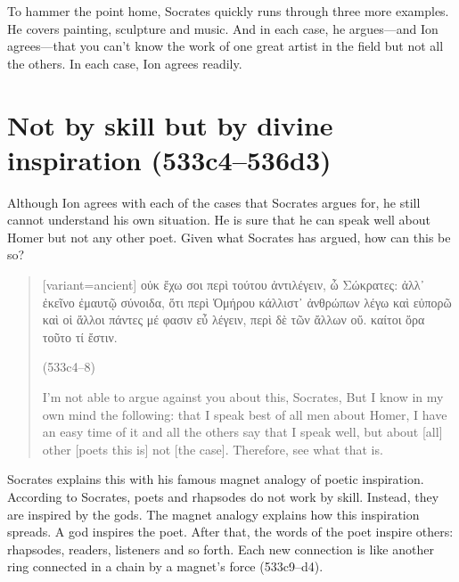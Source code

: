 \documentclass[12pt,letterpaper]{article}
\begin{document}
To hammer the point home, Socrates quickly runs through three more examples. He covers painting, sculpture and music. And in each case, he argues---and Ion agrees---that you can't know the work of one great artist in the field but not all the others. In each case, Ion agrees readily.


\section{Not by skill but by divine inspiration (533c4--536d3)}

Although Ion agrees with each of the cases that Socrates argues for, he still cannot understand his own situation. He is sure that he can speak well about Homer but not any other poet. Given what Socrates has argued, how can this be so?

\begin{quote}
    \begin{greek}[variant=ancient]
    οὐκ ἔχω σοι περὶ τούτου ἀντιλέγειν, ὦ Σώκρατες: ἀλλ᾽ ἐκεῖνο ἐμαυτῷ σύνοιδα, ὅτι περὶ Ὁμήρου κάλλιστ᾽ ἀνθρώπων λέγω καὶ εὐπορῶ καὶ οἱ ἄλλοι πάντες μέ φασιν εὖ λέγειν, περὶ δὲ τῶν ἄλλων οὔ. καίτοι ὅρα τοῦτο τί ἔστιν.
    \end{greek} (533c4--8)

    I'm not able to argue against you about this, Socrates, But I know in my own mind the following: that I speak best of all men about Homer, I have an easy time of it and all the others say that I speak well, but about [all] other [poets this is] not [the case]. Therefore, see what that is.
\end{quote}

Socrates explains this with his famous magnet analogy of poetic inspiration. According to Socrates, poets and rhapsodes do not work by skill. Instead, they are inspired by the gods. The magnet analogy explains how this inspiration spreads. A god inspires the poet. After that, the words of the poet inspire others: rhapsodes, readers, listeners and so forth. Each new connection is like another ring connected in a chain by a magnet's force (533c9--d4).
\end{document}
